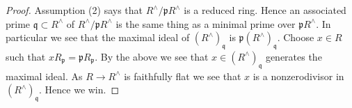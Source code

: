 \documentclass[10pt,a4paper]{amsart}
\theoremstyle{plain}
\theoremstyle{definition}
\theoremstyle{remark}
\numberwithin{equation}{subsection}
\begin{document}
\begin{proof}
Assumption (2) says that $R^\wedge/\mathfrak pR^\wedge$ is a reduced ring.
Hence an associated prime $\mathfrak q \subset R^\wedge$
of $R^\wedge/\mathfrak pR^\wedge$
is the same thing as a minimal prime over $\mathfrak pR^\wedge$.
In particular we see that the maximal ideal of $(R^\wedge)_{\mathfrak q}$
is $\mathfrak p(R^\wedge)_{\mathfrak q}$.
Choose $x \in R$ such that $xR_{\mathfrak p} = \mathfrak pR_{\mathfrak p}$.
By the above we see that $x \in (R^\wedge)_{\mathfrak q}$ generates
the maximal ideal. As $R \to R^\wedge$ is faithfully flat we see that
$x$ is a nonzerodivisor in $(R^\wedge)_{\mathfrak q}$.
Hence we win.
\end{proof}
\end{document}
